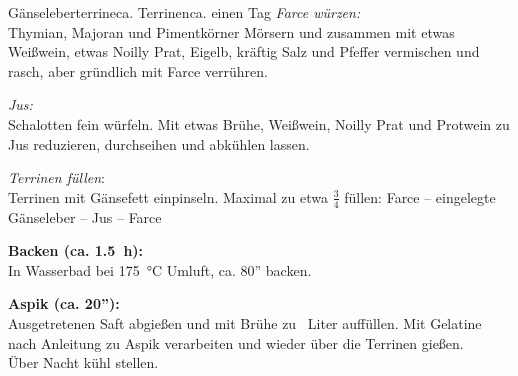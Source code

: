 \begin{MyRecipe}{Gänseleberterrine}{ca.  Terrinen}{ca. einen Tag}
\textit{Farce würzen:}\\	
Thymian, Majoran und Pimentkörner Mörsern und zusammen mit etwas Weißwein, etwas Noilly Prat, Eigelb, kräftig Salz und Pfeffer vermischen und rasch, aber gründlich mit Farce verrühren.



	
\textit{Jus:}\\	
Schalotten fein würfeln. Mit etwas Brühe, Weißwein, Noilly Prat und Protwein zu Jus reduzieren, durchseihen und abkühlen lassen.


\textit{Terrinen füllen}:\\
Terrinen mit Gänsefett einpinseln. Maximal zu etwa $\frac34$ füllen: Farce -- eingelegte Gänseleber -- Jus -- Farce\par\bigskip

\textbf{Backen (ca. 1.5~h):}\\
In Wasserbad bei \SI{175}{\celsius} Umluft, ca. 80'' backen.\par\bigskip

\textbf{Aspik (ca. 20''):}\\
Ausgetretenen Saft abgießen und mit Brühe zu ~Liter auffüllen. Mit Gelatine nach Anleitung zu Aspik verarbeiten und wieder über die Terrinen gießen.\\
Über Nacht kühl stellen.
\par\bigskip



			
\end{MyRecipe}